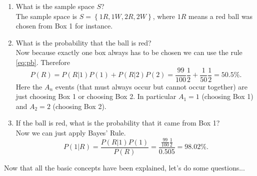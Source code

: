 \begin{enumerate}
 \item What is the sample space $S$?\\
 The sample space is $S=\left\{ 1R, 1W, 2R, 2W \right\}$, where $1R$ means a red ball was chosen from Box 1 for instance.
 \item What is the probability that the ball is red?\\
 Now because exactly one box always has to be chosen we can use the rule \eqref{eq:pb}. Therefore 
 \begin{equation*}
  P(R)=P(R|1)P(1)+P(R|2)P(2)=\frac{99}{100}\frac{1}{2}+\frac{1}{50}\frac{1}{2}=50.5\%.
 \end{equation*}
 Here the $A_n$ events (that must always occur but cannot occur together) are just choosing Box 1 or choosing Box 2. In particular $A_{1}=1$ (choosing Box 1) and $A_{2}=2$ (choosing Box 2).
 \item If the ball is red, what is the probability that it came from Box 1?\\
 Now we can just apply Bayes' Rule.
 \begin{equation*}
  P(1|R)=\frac{P(R|1)P(1)}{P(R)}=\frac{\frac{99}{100}\frac{1}{2}}{0.505}=98.02\%.
 \end{equation*}
\end{enumerate}

Now that all the basic concepts have been explained, let's do some questions...

